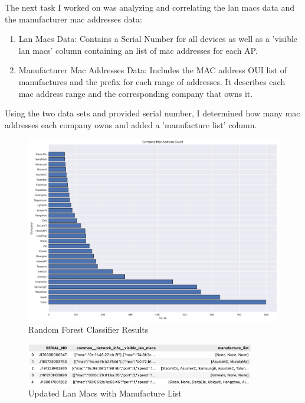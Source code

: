 \documentclass{article}
\begin{document}
The next task I worked on was analyzing and correlating the lan macs data and the manufacturer mac addresses data:

\begin{enumerate}
    \item Lan Macs Data: Contains a Serial Number for all devices as well as a 'visible lan macs' column containing an list of mac addresses for each AP. 
    \item Manufacturer Mac Addresses Data: Includes the MAC address OUI list of manufactures and the prefix for each range of addresses. It describes each mac address range and the corresponding company that owns it.
\end{enumerate}
Using the two data sets and provided serial number, I determined how many mac addresses each company owns and added a 'manufacture list' column.

\begin{figure}[htp]
    \centering
    \includegraphics[width=12cm]{visuals/company_mac_address_counts.png}
    \caption{Random Forest Classifier Results}
\end{figure}

\begin{figure}[htp]
    \centering
    \includegraphics[width=10cm]{visuals/Screen Shot 2021-08-13 at 12.37.03 AM.png}
    \caption{Updated Lan Macs with Manufacture List}
\end{figure}

\newpage
\end{document}
